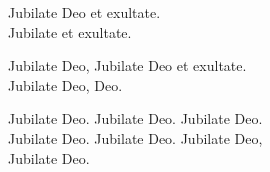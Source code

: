 
Jubilate Deo et exultate. \\
Jubilate et exultate. 

\spazio

Jubilate Deo, Jubilate Deo et exultate.\\
Jubilate Deo, Deo.

\spazio

Jubilate Deo. Jubilate Deo. Jubilate Deo.\\
Jubilate Deo. Jubilate Deo. Jubilate Deo,\\
Jubilate Deo.
